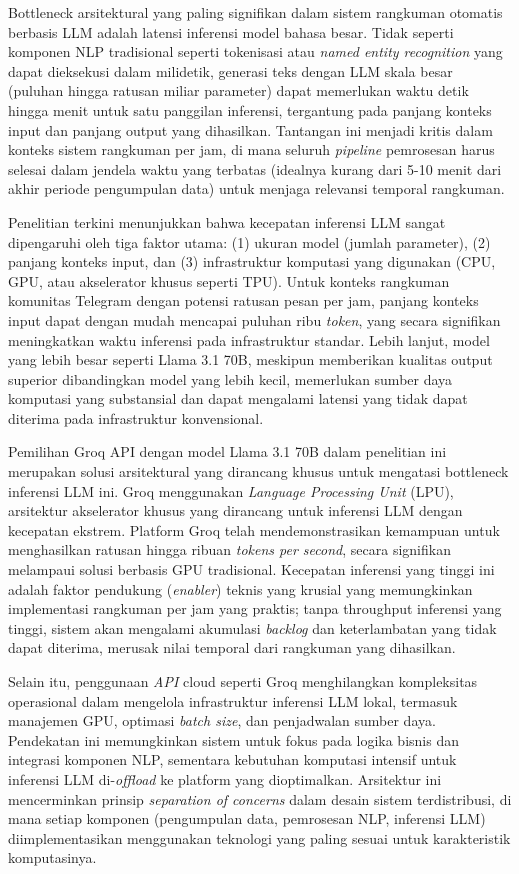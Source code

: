 Bottleneck arsitektural yang paling signifikan dalam sistem rangkuman otomatis berbasis LLM adalah latensi inferensi model bahasa besar. Tidak seperti komponen NLP tradisional seperti tokenisasi atau \textit{named entity recognition} yang dapat dieksekusi dalam milidetik, generasi teks dengan LLM skala besar (puluhan hingga ratusan miliar parameter) dapat memerlukan waktu detik hingga menit untuk satu panggilan inferensi, tergantung pada panjang konteks input dan panjang output yang dihasilkan. Tantangan ini menjadi kritis dalam konteks sistem rangkuman per jam, di mana seluruh \textit{pipeline} pemrosesan harus selesai dalam jendela waktu yang terbatas (idealnya kurang dari 5-10 menit dari akhir periode pengumpulan data) untuk menjaga relevansi temporal rangkuman.

Penelitian terkini menunjukkan bahwa kecepatan inferensi LLM sangat dipengaruhi oleh tiga faktor utama: (1) ukuran model (jumlah parameter), (2) panjang konteks input, dan (3) infrastruktur komputasi yang digunakan (CPU, GPU, atau akselerator khusus seperti TPU). Untuk konteks rangkuman komunitas Telegram dengan potensi ratusan pesan per jam, panjang konteks input dapat dengan mudah mencapai puluhan ribu \textit{token}, yang secara signifikan meningkatkan waktu inferensi pada infrastruktur standar. Lebih lanjut, model yang lebih besar seperti Llama 3.1 70B, meskipun memberikan kualitas output superior dibandingkan model yang lebih kecil, memerlukan sumber daya komputasi yang substansial dan dapat mengalami latensi yang tidak dapat diterima pada infrastruktur konvensional.

Pemilihan Groq API dengan model Llama 3.1 70B dalam penelitian ini merupakan solusi arsitektural yang dirancang khusus untuk mengatasi bottleneck inferensi LLM ini. Groq menggunakan \textit{Language Processing Unit} (LPU), arsitektur akselerator khusus yang dirancang untuk inferensi LLM dengan kecepatan ekstrem. Platform Groq telah mendemonstrasikan kemampuan untuk menghasilkan ratusan hingga ribuan \textit{tokens per second}, secara signifikan melampaui solusi berbasis GPU tradisional. Kecepatan inferensi yang tinggi ini adalah faktor pendukung (\textit{enabler}) teknis yang krusial yang memungkinkan implementasi rangkuman per jam yang praktis; tanpa throughput inferensi yang tinggi, sistem akan mengalami akumulasi \textit{backlog} dan keterlambatan yang tidak dapat diterima, merusak nilai temporal dari rangkuman yang dihasilkan.

Selain itu, penggunaan \textit{API} cloud seperti Groq menghilangkan kompleksitas operasional dalam mengelola infrastruktur inferensi LLM lokal, termasuk manajemen GPU, optimasi \textit{batch size}, dan penjadwalan sumber daya. Pendekatan ini memungkinkan sistem untuk fokus pada logika bisnis dan integrasi komponen NLP, sementara kebutuhan komputasi intensif untuk inferensi LLM di-\textit{offload} ke platform yang dioptimalkan. Arsitektur ini mencerminkan prinsip \textit{separation of concerns} dalam desain sistem terdistribusi, di mana setiap komponen (pengumpulan data, pemrosesan NLP, inferensi LLM) diimplementasikan menggunakan teknologi yang paling sesuai untuk karakteristik komputasinya.

